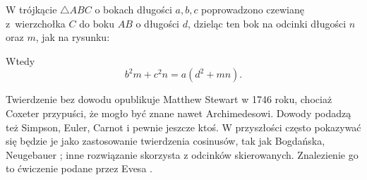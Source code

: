\begin{theorem}[Stewarta, 1746]
	W trójkącie $\triangle ABC$ o bokach długości $a, b, c$ poprowadzono czewianę z~wierzchołka $C$ do boku $AB$ o długości $d$, dzieląc ten bok na odcinki długości $n$ oraz $m$, jak na rysunku:
	\begin{center}
\begin{comment}
    \begin{tikzpicture}[scale=.4]
        \tkzDefPoint(0, 0){A}
		\tkzDefPoint(3.25, 3.25){d}

		\tkzDefPoint(6, 0){AB}
        \tkzDefPoint(10, 0){B}
        \tkzDefPoint(1, 7){C}
        \tkzDefPoint(35:4.75){CC}
		\tkzDrawSegments(C,AB)
        \tkzDrawPolygon[line width=0.3mm](A,B,C)

        \tkzLabelPoint[below left](A){$A$}
        \tkzLabelPoint[below right](B){$B$}
        \tkzLabelPoint[above](C){$C$}

        \tkzLabelPoint(d){$d$}

		\tkzDrawPoints[size=3,color=black,fill=black!80](A,B,C,AB)
		\tkzDrawSegment[dim={$\,\,c\,\,$,-16pt,transform shape}](A,B)
		\tkzDrawSegment[dim={$\,\,n\,\,$,-8pt,transform shape}](A,AB)
		\tkzDrawSegment[dim={$\,\,m\,\,$,-8pt,transform shape}](AB,B)
		\tkzDrawSegment[dim={$\,\,b\,\,$,8pt,transform shape,sloped}](A,C)
		\tkzDrawSegment[dim={$\,\,a\,\,$,-8pt,transform shape,sloped}](B,C)
    \end{tikzpicture}
\end{comment}
    \end{center}
	Wtedy
	\begin{equation}
		b^2 m + c^2 n = a (d^2 + mn).
	\end{equation}
\end{theorem}

Twierdzenie bez dowodu opublikuje Matthew Stewart w 1746 roku, chociaż Coxeter przypuści, że mogło być znane nawet Archimedesowi.
%
%
Dowody podadzą też Simpson, Euler, Carnot i pewnie jeszcze ktoś.
%
%
%
W przyszłości często pokazywać się będzie je jako zastosowanie twierdzenia cosinusów, tak jak Bogdańska, Neugebauer \cite[s. 90-91]{neugebauer_2018}; inne rozwiązanie skorzysta z odcinków skierowanych.
Znalezienie go to ćwiczenie podane przez Evesa \cite[s. 58]{eves1_1972}.

